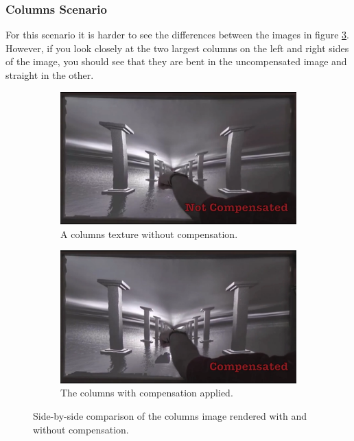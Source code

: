 \documentclass[]{article}
\begin{document}
\subsubsection{Columns Scenario}

For this scenario it is harder to see the differences between the images in figure \ref{fig:ColumnsComparison}. However, if you look closely at the two largest columns on the left and right sides of the image, you should see that they are bent in the uncompensated image and straight in the other.

\begin{figure}[!h]
\centering
\begin{subfigure}{.5\textwidth}
  \centering
  \includegraphics[width=0.9\linewidth]{figures/compensation/ColumnsNotCompensated.png}
  \caption{A columns texture without compensation.}
  \label{fig:ColumnsNotCompensated}
\end{subfigure}%
\begin{subfigure}{.5\textwidth}
  \centering
  \includegraphics[width=0.9\linewidth]{figures/compensation/ColumnsCompensated.png}
  \caption{The columns with compensation applied.}
  \label{fig:ColumnsCompensated}
\end{subfigure}
\caption{Side-by-side comparison of the columns image rendered with and without compensation.}
\label{fig:ColumnsComparison}
\end{figure}
\end{document}

